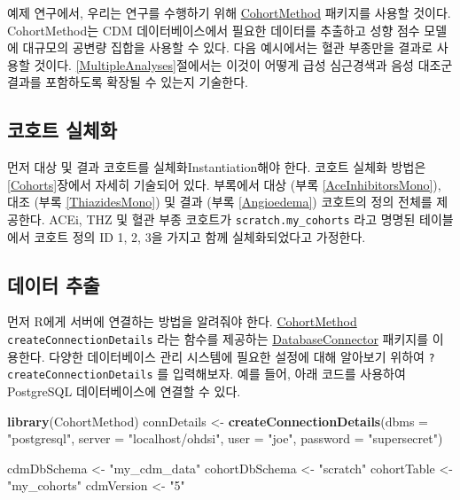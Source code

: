 \documentclass[10.5pt]{book}
\newenvironment{Shaded}{\begin{snugshade}}{\end{snugshade}}
\newcommand{\KeywordTok}[1]{\textcolor[rgb]{0.13,0.29,0.53}{\textbf{#1}}}
\newcommand{\DataTypeTok}[1]{\textcolor[rgb]{0.13,0.29,0.53}{#1}}
\newcommand{\StringTok}[1]{\textcolor[rgb]{0.31,0.60,0.02}{#1}}
\newcommand{\NormalTok}[1]{#1}
\theoremstyle{definition}
\theoremstyle{definition}
\theoremstyle{definition}
\theoremstyle{remark}
\begin{document}
예제 연구에서, 우리는 연구를 수행하기 위해
\href{https://ohdsi.github.io/CohortMethod/}{CohortMethod} 패키지를
사용할 것이다. CohortMethod는 CDM 데이터베이스에서 필요한 데이터를
추출하고 성향 점수 모델에 대규모의 공변량 집합을 사용할 수 있다. 다음
예시에서는 혈관 부종만을 결과로 사용할 것이다.
\ref{MultipleAnalyses}절에서는 이것이 어떻게 급성 심근경색과 음성 대조군
결과를 포함하도록 확장될 수 있는지 기술한다.

\subsection{코호트 실체화}\label{-}

먼저 대상 및 결과 코호트를 실체화Instantiation해야 한다. 코호트 실체화
방법은 \ref{Cohorts}장에서 자세히 기술되어 있다. 부록에서 대상 (부록
\ref{AceInhibitorsMono}), 대조 (부록 \ref{ThiazidesMono}) 및 결과 (부록
\ref{Angioedema}) 코호트의 정의 전체를 제공한다. ACEi, THZ 및 혈관 부종
코호트가 \texttt{scratch.my\_cohorts} 라고 명명된 테이블에서 코호트 정의
ID 1, 2, 3을 가지고 함께 실체화되었다고 가정한다.

\subsection{데이터 추출}\label{-}

먼저 R에게 서버에 연결하는 방법을 알려줘야 한다.
\href{https://ohdsi.github.io/CohortMethod/}{CohortMethod}
\texttt{createConnectionDetails} 라는 함수를 제공하는
\href{https://ohdsi.github.io/DatabaseConnector/}{DatabaseConnector}
패키지를 이용한다. 다양한 데이터베이스 관리 시스템에 필요한 설정에 대해
알아보기 위하여 \texttt{?createConnectionDetails} 를 입력해보자. 예를
들어, 아래 코드를 사용하여 PostgreSQL 데이터베이스에 연결할 수 있다.

\begin{Shaded}
\begin{Highlighting}[]
\KeywordTok{library}\NormalTok{(CohortMethod)}
\NormalTok{connDetails <-}\StringTok{ }\KeywordTok{createConnectionDetails}\NormalTok{(}\DataTypeTok{dbms =} \StringTok{"postgresql"}\NormalTok{,}
                                       \DataTypeTok{server =} \StringTok{"localhost/ohdsi"}\NormalTok{,}
                                       \DataTypeTok{user =} \StringTok{"joe"}\NormalTok{,}
                                       \DataTypeTok{password =} \StringTok{"supersecret"}\NormalTok{)}

\NormalTok{cdmDbSchema <-}\StringTok{ "my_cdm_data"}
\NormalTok{cohortDbSchema <-}\StringTok{ "scratch"}
\NormalTok{cohortTable <-}\StringTok{ "my_cohorts"}
\NormalTok{cdmVersion <-}\StringTok{ "5"}
\end{Highlighting}
\end{Shaded}
\end{document}

